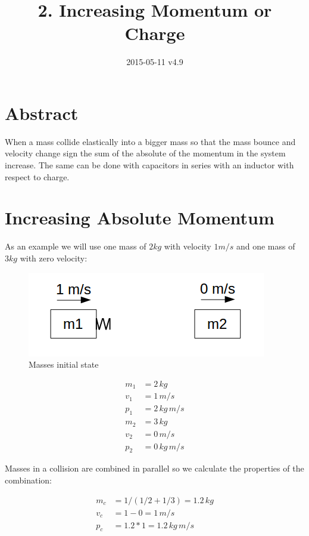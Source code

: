 \documentclass[]{elementary-physics}
\title{2. Increasing Momentum or Charge}
\date{2015-05-11 v4.9}
\begin{document}
\maketitle

\tableofcontents

\section{Abstract}

When a mass collide elastically into a bigger mass so that the mass bounce and velocity change sign the sum of the absolute of the momentum in the system increase.
The same can be done with capacitors in series with an inductor with respect to charge.

\section{Increasing Absolute Momentum}

As an example we will use one mass of $2 kg$ with velocity $1 m/s$ and one mass of $3 kg$ with zero velocity:

\begin{figure}[ht] \centering
	\includegraphics[scale=.5]{mms4} \caption{Masses initial state}
\end{figure}

\begin{subequations}
\begin{align}
m_1 &= 2 \, kg \\
v_1 &= 1 \, m/s \\
p_1 &= 2 \, kg \, m/s \\
m_2 &= 3 \, kg \\
v_2 &= 0 \, m/s \\
p_2 &= 0 \, kg \, m/s
\end{align}
\end{subequations}

Masses in a collision are combined in parallel\cite{ef1ch} so we calculate the properties of the combination:

\begin{subequations}
\begin{align}
m_c &= 1/(1/2 + 1/3) = 1.2 \, kg \\
v_c &= 1 - 0 = 1 \, m/s \\
p_c &= 1.2 * 1 = 1.2 \, kg \, m/s
\end{align}
\end{subequations}
\end{document}
